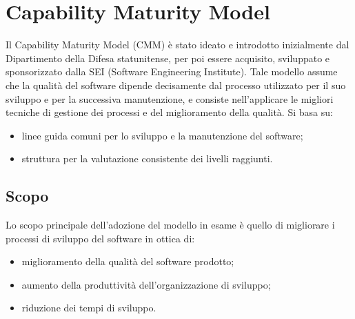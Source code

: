 \documentclass[PdQ.tex]{subfiles}
\begin{document}
\hypertarget{CMM}{\section{Capability Maturity Model}}
	Il Capability Maturity Model (CMM) è stato ideato e introdotto inizialmente dal Dipartimento della Difesa statunitense, per poi essere acquisito, sviluppato e sponsorizzato dalla SEI (Software Engineering Institute). Tale modello
assume che la qualità del software dipende decisamente dal processo utilizzato per il suo sviluppo e per la successiva manutenzione, e consiste nell'applicare le migliori tecniche di gestione dei processi e del miglioramento della qualità. Si basa su:
	\begin{itemize}
		\item linee guida comuni per lo sviluppo e la manutenzione del software;
		\item struttura per la valutazione consistente dei livelli raggiunti.
	\end{itemize}
	
	\subsection{Scopo}
	Lo scopo principale dell'adozione del modello in esame è quello di migliorare i processi di sviluppo del software in ottica di:
	\begin{itemize}
		\item miglioramento della qualità del software prodotto;
		\item aumento della produttività dell'organizzazione di sviluppo;
		\item riduzione dei tempi di sviluppo.
	\end{itemize}
\end{document}

